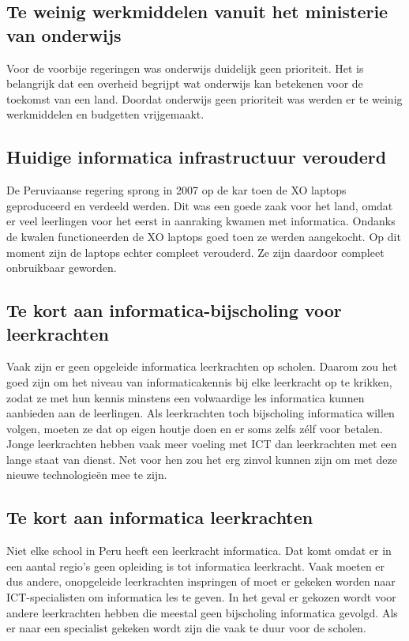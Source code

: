 \subsection{Te weinig werkmiddelen vanuit het ministerie van onderwijs}
Voor de voorbije regeringen was onderwijs duidelijk geen prioriteit. Het is belangrijk dat een overheid begrijpt wat onderwijs kan betekenen voor de toekomst van een land. Doordat onderwijs geen prioriteit was werden er te weinig werkmiddelen en budgetten vrijgemaakt.

\subsection{Huidige informatica infrastructuur verouderd}
De Peruviaanse regering sprong in 2007 op de kar toen de XO laptops geproduceerd en verdeeld werden. Dit was een goede zaak voor het land, omdat er veel leerlingen voor het eerst in aanraking kwamen met informatica. Ondanks de kwalen functioneerden de XO laptops goed toen ze werden aangekocht. Op dit moment zijn de laptops echter compleet verouderd. Ze zijn daardoor compleet onbruikbaar geworden.

\subsection{Te kort aan informatica-bijscholing voor leerkrachten}
Vaak zijn er geen opgeleide informatica leerkrachten op scholen. Daarom zou het goed zijn om het niveau van informaticakennis bij elke leerkracht op te krikken, zodat ze met hun kennis minstens een volwaardige les informatica kunnen 	aanbieden aan de leerlingen. Als leerkrachten toch bijscholing informatica willen volgen, moeten ze dat op eigen houtje doen en er soms zelfs zélf voor betalen. Jonge leerkrachten hebben vaak meer voeling met ICT dan leerkrachten met een lange staat van dienst. Net voor hen zou het erg zinvol kunnen zijn om met deze nieuwe technologieën mee te zijn. 

\subsection{Te kort aan informatica leerkrachten}
Niet elke school in Peru heeft een leerkracht informatica. Dat komt omdat er in een aantal regio's geen opleiding is tot informatica leerkracht. Vaak moeten er dus andere, onopgeleide leerkrachten inspringen of moet er gekeken worden naar ICT-specialisten om informatica les te geven. In het geval er gekozen wordt voor andere leerkrachten hebben die meestal geen bijscholing informatica gevolgd. Als er naar een specialist gekeken wordt zijn die vaak te duur voor de scholen. 

